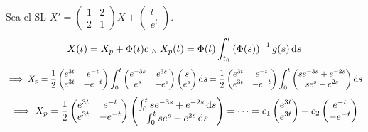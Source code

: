 \begin{ejem}
	Sea el SL $X' = \begin{pmatrix}
			1 & 2 \\
			2 & 1
		\end{pmatrix} X + \begin{pmatrix}
			t \\
			e^t
		\end{pmatrix}$.
	\[X(t) = X_p + \Phi(t) c \we X_p(t) = \Phi(t) \int_{t_0}^{t} \left(\Phi(s)\right)^{-1} g(s) \odif{s}\]
	\[\implies X_p = \frac{1}{2} \begin{pmatrix}
			e^{3t} & e^{-t}  \\
			e^{3t} & -e^{-t}
		\end{pmatrix} \int_{0}^{t} \begin{pmatrix}
			e^{-3s} & e^{3s} \\
			e^{s}   & -e^{s}
		\end{pmatrix} \begin{pmatrix}
			s \\
			e^s
		\end{pmatrix} \odif{s} = \frac{1}{2} \begin{pmatrix}
			e^{3t} & e^{-t}  \\
			e^{3t} & -e^{-t}
		\end{pmatrix} \int_{0}^{t} \begin{pmatrix}
			s e^{-3s} + e^{-2s} \\
			s e^{s} - e^{2s}    \\
		\end{pmatrix} \odif{s}\]
	\[\implies X_p = \frac{1}{2} \begin{pmatrix}
			e^{3t} & e^{-t}  \\
			e^{3t} & -e^{-t}
		\end{pmatrix} \begin{pmatrix}
			\int_{0}^{t} s e^{-3s} + e^{-2s} \odif{s} \\
			\int_{0}^{t} s e^{s} - e^{2s} \odif{s}
		\end{pmatrix} = \cdots = c_1 \begin{pmatrix}
			e^{3t} \\
			e^{3t}
		\end{pmatrix} + c_2 \begin{pmatrix}
			e^{-t} \\
			-e^{-t}
		\end{pmatrix}\]
\end{ejem}



